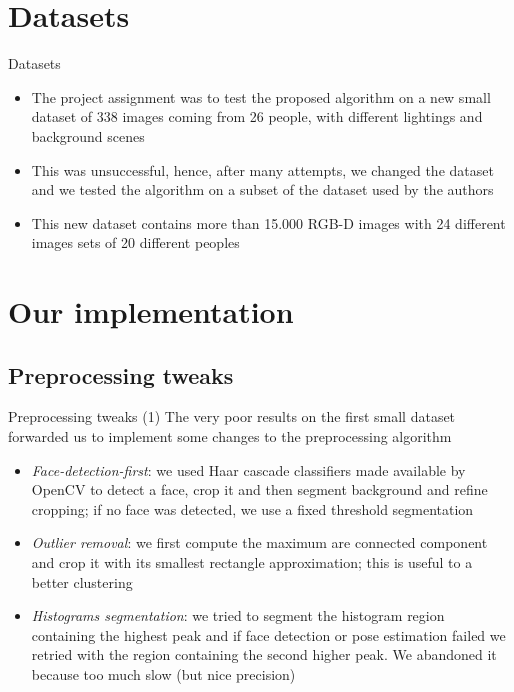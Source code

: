 \documentclass[unknownkeysallowed]{beamer}
\begin{document}
\section{Datasets}
\begin{frame}{Datasets}
	\begin{itemize}
		\item The project assignment was to test the proposed algorithm
			on a new small dataset of 338 images coming from 26
			people, with different lightings and background scenes
		\item This was unsuccessful, hence, after many attempts, we
			changed the dataset and we tested the algorithm on a
			subset of the dataset used by the authors
		\item This new dataset contains more than 15.000 RGB-D images
			with 24 different images sets of 20 different peoples
	\end{itemize}
\end{frame}

\section{Our implementation}
\subsection{Preprocessing tweaks}
\begin{frame}{Preprocessing tweaks (1)}
	The very poor results on the first small dataset
	forwarded us to implement some changes to the
	preprocessing algorithm
	\begin{itemize}
		\item \textit{Face-detection-first}: we used Haar cascade
			classifiers made available by OpenCV to detect a face,
			crop it and then segment background and refine
			cropping; if no face was detected, we use a fixed
			threshold segmentation
		\item \textit{Outlier removal}: we first compute the maximum
			are connected component and crop it with its smallest
			rectangle approximation; this is useful to a better
			clustering
		\item \textit{Histograms segmentation}: we tried to segment the
			histogram region containing the highest peak and if face
			detection or pose estimation failed we retried
			with the region containing the second higher peak. We
			abandoned it because too much slow (but nice
			precision)
	\end{itemize}
\end{frame}
\end{document}
